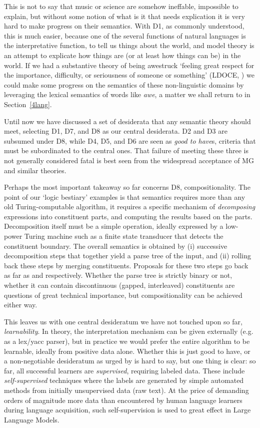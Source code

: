 \documentclass[output=paper,colorlinks=true,citecolor=brown]{langscibook}
\begin{document}
This is not to say that music or science are somehow ineffable, impossible to
explain, but without some notion of what is it that needs explication it is
very hard to make progress on their semantics. With D1, as commonly
understood, this is much easier, because one of the several functions of
natural languages is the interpretative function, to tell us things about the
world, and model theory is an attempt to explicate how things are (or at least
how things can be) in the world. If we had a substantive theory of being
awestruck `feeling great respect for the importance, difficulty, or
seriousness of someone or something' (LDOCE, \cite{Procter:1978}) we could
make some progress on the semantics of these non-linguistic domains by
leveraging the lexical semantics of words like {\it awe}, a matter we shall
return to in Section~\ref{4lang}.

\medskip\noindent Until now we have discussed a set of desiderata that any
semantic theory should meet, selecting D1, D7, and D8 as our central
desiderata. D2 and D3 are subsumed under D8, while D4, D5, and D6 are seen as
{\it good to have}s, criteria that must be subordinated to the central
ones. That failure of meeting these three is not generally considered fatal is
best seen from the widespread acceptance of MG and similar theories.

Perhaps the most important takeaway so far concerns D8, compositionality. The
point of our `logic bestiary' examples is that semantics requires more than
any old Turing-computable algorithm, it requires a specific mechanism of {\it
  decomposing} expressions into constituent parts, and computing the results
based on the parts. Decomposition itself must be a simple operation, ideally
expressed by a low-power Turing machine such as a finite state transducer that
detects the constituent boundary. The overall semantics is obtained by (i)
successive decomposition steps that together yield a parse tree of the input,
and (ii) rolling back these steps by merging constituents. Proposals for these
two steps go back as far as \citet{Wells:1947} and \citet{Knuth:1968}
respectively. Whether the parse tree is strictly binary or not, whether it can
contain discontinuous (gapped, interleaved) constituents are questions of
great technical importance, but compositionality can be achieved either way.

This leaves us with one central desideratum we have not touched upon so far,
{\it learnability}. In theory, the interpretation mechanism can be given
externally (e.g. as a lex/yacc parser), but in practice we would prefer the
entire algorithm to be learnable, ideally from positive data alone. Whether
this is just good to have, or a non-negotiable desideratum as urged by
\citet{Chomsky:1965} is hard to say, but one thing is clear: so far, all
successful learners are {\it supervised}, requiring labeled data. These
include {\it self-supervised} techniques where the labels are generated by
simple automated methods from initially unsupervised data (raw text). At the
price of demanding orders of magnitude more data than encountered by human
language learners during language acquisition, such self-supervision is used
to great effect in Large Language Models.
\end{document}
